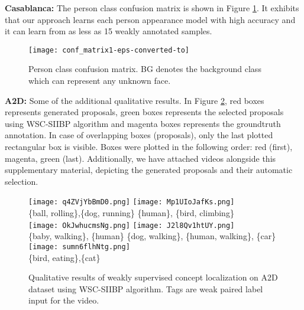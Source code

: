 \documentclass[runningheads]{llncs}
\begin{document}
{\bf Casablanca:} The person class confusion matrix is shown in Figure \ref{Fig1}. It exhibits that our approach learns each person appearance model with high accuracy and it can learn from as less as 15 weakly annotated samples.
\begin{figure}[!h]
\centering
\texttt{[image: conf\_matrix1-eps-converted-to]}
\caption{Person class confusion matrix. BG denotes the background class which can represent any unknown face.}
\label{Fig1}
\end{figure}{\bf A2D:} Some of the additional qualitative results. In Figure \ref{Fig2}, red boxes represents generated proposals, green boxes represents the selected proposals using WSC-SIIBP algorithm and magenta boxes represents the groundtruth annotation. In case of overlapping boxes (proposals), only the last plotted rectangular box is visible. Boxes were plotted in the following order: red (first), magenta, green (last). Additionally, we have attached videos alongside this supplementary material, depicting the generated proposals and their automatic selection.
\begin{figure}[!h]
\centering
\texttt{[image: q4ZVjYbBmD0.png]}
\texttt{[image: Mp1UIoJafKs.png]} \\
\noindent \{ball, rolling\},\{dog, running\} \hspace{3cm} \{human\}, \{bird, climbing\} \\
\texttt{[image: OkJwhucmsNg.png]} 
\texttt{[image: J2l8Qv1htUY.png]} \\
\{baby, walking\}, \{human\} \hspace{2cm} \{dog, walking\}, \{human, walking\}, \{car\} \\
\texttt{[image: sumn6flhNtg.png]} \\
\{bird, eating\},\{cat\}
\caption{Qualitative results of weakly supervised concept localization on A2D dataset using WSC-SIIBP algorithm. Tags are weak paired label input for the video.}
\label{Fig2}
\end{figure}

\clearpage
  


\end{document}
